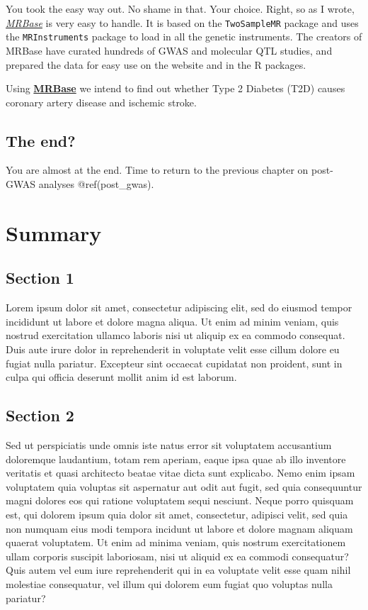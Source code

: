 \documentclass[
]{book}
\newcommand{\passthrough}[1]{#1}
\begin{document}
You took the easy way out. No shame in that. Your choice. Right, so as I wrote, \emph{\href{http://www.mrbase.org/}{MRBase}} is very easy to handle. It is based on the \passthrough{\lstinline!TwoSampleMR!} package and uses the \passthrough{\lstinline!MRInstruments!} package to load in all the genetic instruments. The creators of MRBase have curated hundreds of GWAS and molecular QTL studies, and prepared the data for easy use on the website and in the R packages.

Using \textbf{\href{http://www.mrbase.org/}{MRBase}} we intend to find out whether Type 2 Diabetes (T2D) causes coronary artery disease and ischemic stroke.

\hypertarget{the-end}{%
\section{The end?}\label{the-end}}

You are almost at the end. Time to return to the previous chapter on post-GWAS analyses @ref(post\_gwas).

\hypertarget{summary}{%
\chapter*{Summary}\label{summary}}

\hypertarget{section-1-2}{%
\section{Section 1}\label{section-1-2}}

Lorem ipsum dolor sit amet, consectetur adipiscing elit, sed do eiusmod tempor incididunt ut labore et dolore magna aliqua. Ut enim ad minim veniam, quis nostrud exercitation ullamco laboris nisi ut aliquip ex ea commodo consequat. Duis aute irure dolor in reprehenderit in voluptate velit esse cillum dolore eu fugiat nulla pariatur. Excepteur sint occaecat cupidatat non proident, sunt in culpa qui officia deserunt mollit anim id est laborum.

\hypertarget{section-2-2}{%
\section{Section 2}\label{section-2-2}}

Sed ut perspiciatis unde omnis iste natus error sit voluptatem accusantium doloremque laudantium, totam rem aperiam, eaque ipsa quae ab illo inventore veritatis et quasi architecto beatae vitae dicta sunt explicabo. Nemo enim ipsam voluptatem quia voluptas sit aspernatur aut odit aut fugit, sed quia consequuntur magni dolores eos qui ratione voluptatem sequi nesciunt. Neque porro quisquam est, qui dolorem ipsum quia dolor sit amet, consectetur, adipisci velit, sed quia non numquam eius modi tempora incidunt ut labore et dolore magnam aliquam quaerat voluptatem. Ut enim ad minima veniam, quis nostrum exercitationem ullam corporis suscipit laboriosam, nisi ut aliquid ex ea commodi consequatur? Quis autem vel eum iure reprehenderit qui in ea voluptate velit esse quam nihil molestiae consequatur, vel illum qui dolorem eum fugiat quo voluptas nulla pariatur?
\end{document}
